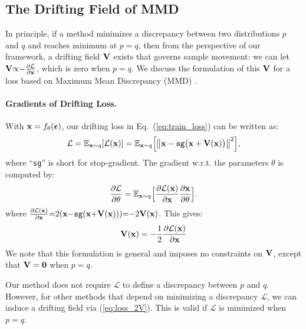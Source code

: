 \subsection{The Drifting Field of MMD}
\label{sec:theory_mmd_relation}

In principle, if a method minimizes a discrepancy between two distributions $p$ and $q$ and reaches minimum at $p=q$, then from the perspective of our framework, a drifting field $\mathbf{V}$ exists that governs sample movement: we can let $\mathbf{V}{\propto}{-}\frac{\partial\mathcal L }{\partial {\mathbf{x}}}$, which is zero when $p=q$.
We discuss the formulation of this $\mathbf{V}$ for a loss based on Maximum Mean Discrepancy (MMD) \cite{li2015generative,dziugaite2015training}.

\newcommand{\kkk}{\tilde{k}}
\paragraph{Gradients of Drifting Loss.}
With $\mathbf{x}=f_\theta({\boldsymbol{\epsilon}})$, our drifting loss in Eq.~(\ref{eq:train_loss}) can be written as:
\begin{equation}
\mathcal{L}
=
\mathbb{E}_{\mathbf{x}{\sim}q}
[
\mathcal{L}(\mathbf{x})
]
=
\mathbb{E}_{\mathbf{x}{\sim}q}
\Big[
\big\|
\mathbf{x}
-
\text{\texttt{sg}}\big(
\mathbf{x}
+
\mathbf{V}(\mathbf{x})
\big)
\big\|^2
\Big],
\end{equation}
where ``\texttt{sg}'' is short for stop-gradient. The gradient w.r.t. the parameters $\theta$ is computed by:
\begin{equation}
\frac{\partial\mathcal L }{\partial {\theta}} =
\mathbb{E}_{\mathbf{x}{\sim}q}\Big[
\frac{\partial\mathcal L(\mathbf{x}) }{\partial {\mathbf{x}}} \frac{\partial\mathbf{x}}{\partial\theta}
\Big].
\end{equation}
where
$
\frac{\partial\mathcal L(\mathbf{x}) }{\partial {\mathbf{x}}}{=}2
(
\mathbf{x}
{-}
\text{\texttt{sg}}(
\mathbf{x}
{+}
\mathbf{V}(\mathbf{x})
)
)
{=}{-}2\mathbf{V}(\mathbf{x})
$. This gives:
\begin{equation}
\label{eq:loss_2V}
\mathbf{V}(\mathbf{x}) = -\frac{1}{2}\frac{\partial\mathcal L(\mathbf{x}) }{\partial {\mathbf{x}}}
\end{equation}
We note that this formulation is general and imposes no constraints on $\mathbf{V}$, except that $\mathbf{V}=\textbf{0}$ when $p=q$.

Our method does not require $\mathcal{L}$ to define a discrepancy between $p$ and $q$. However, for other methods that depend on minimizing a discrepancy $\mathcal{L}$, we can induce a drifting field via (\ref{eq:loss_2V}). This is valid if $\mathcal{L}$ is minimized when $p=q$.

